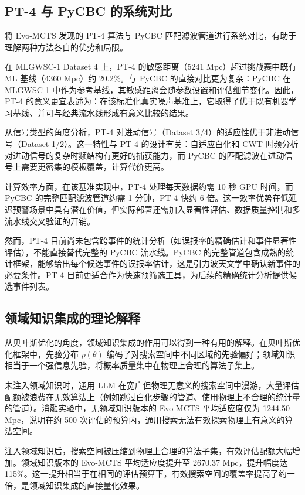 \subsection{PT-4 与 PyCBC 的系统对比}

将 Evo-MCTS 发现的 PT-4 算法与 PyCBC 匹配滤波管道进行系统对比，有助于理解两种方法各自的优势和局限。

在 MLGWSC-1 Dataset 4 上，PT-4 的敏感距离（5241 Mpc）超过挑战赛中既有 ML 基线（4360 Mpc）约 20.2\%。与 PyCBC 的直接对比更为复杂：PyCBC 在 MLGWSC-1 中作为参考基线，其敏感距离会随参数设置和评估细节变化。因此，PT-4 的意义更宜表述为：在该标准化真实噪声基准上，它取得了优于既有机器学习基线、并可与经典流水线形成有意义比较的结果。

从信号类型的角度分析，PT-4 对进动信号（Dataset 3/4）的适应性优于非进动信号（Dataset 1/2）。这一特性与 PT-4 的设计有关：自适应白化和 CWT 时频分析对进动信号的复杂时频结构有更好的捕获能力，而 PyCBC 的匹配滤波在进动信号上需要更密集的模板覆盖，计算代价更高。

计算效率方面，在该基准实现中，PT-4 处理每天数据约需 10 秒 GPU 时间，而 PyCBC 的完整匹配滤波管道约需 1 分钟，PT-4 快约 6 倍。这一效率优势在低延迟预警场景中具有潜在价值，但实际部署还需加入显著性评估、数据质量控制和多流水线交叉验证的开销。

然而，PT-4 目前尚未包含跨事件的统计分析（如误报率的精确估计和事件显著性评估），不能直接替代完整的 PyCBC 流水线。PyCBC 的完整管道包含成熟的统计框架，能够给出每个候选事件的误报率估计，这是引力波天文学中确认新事件的必要条件。PT-4 目前更适合作为快速预筛选工具，为后续的精确统计分析提供候选事件列表。

\subsection{领域知识集成的理论解释}

从贝叶斯优化的角度，领域知识集成的作用可以得到一种有用的解释。在贝叶斯优化框架中，先验分布 $p(\theta)$ 编码了对搜索空间中不同区域的先验偏好；领域知识相当于一个强信息先验，将概率质量集中在物理上合理的算法子集上。

未注入领域知识时，通用 LLM 在宽广但物理无意义的搜索空间中漫游，大量评估配额被浪费在无效算法上（例如跳过白化步骤的管道、使用物理上不合理的统计量的管道）。消融实验中，无领域知识版本的 Evo-MCTS 平均适应度仅为 1244.50 Mpc，说明在约 500 次评估的预算内，通用搜索无法有效探索物理上有意义的算法空间。

注入领域知识后，搜索空间被压缩到物理上合理的算法子集，有效评估配额大幅增加。领域知识版本的 Evo-MCTS 平均适应度提升至 2670.37 Mpc，提升幅度达 115\%。这一提升相当于在相同的评估预算下，有效搜索空间的覆盖率提高了约一倍，是领域知识集成的直接量化效果。

